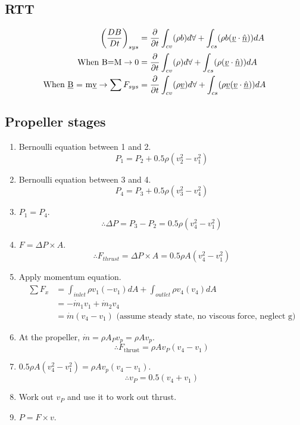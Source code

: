 \subsection{RTT}
\begin{align*}
  \left( \frac{DB}{Dt} \right)_{sys}                                    & = \frac{\partial}{\partial t}\int_{cv}(\rho b) d\forall + \int_{cs} (\rho b(\underline{v} \cdot \underline{\hat{n}})) dA                          \\
  \textrm{When B=M} \rightarrow 0                                       & = \frac{\partial}{\partial t}\int_{cv}(\rho) d\forall + \int_{cs} (\rho(\underline{v} \cdot \underline{\hat{n}})) dA                              \\
  \textrm{When \underline{B} = m\underline{v}} \rightarrow \sum F_{sys} & = \frac{\partial}{\partial t}\int_{cv}(\rho \underline{v}) d\forall + \int_{cs} (\rho \underline{v} (\underline{v} \cdot \underline{\hat{n}})) dA \\
\end{align*}
\subsection{Propeller stages}
\begin{enumerate}
  \item Bernoulli equation between 1 and 2. \[ P_1 = P_2 +0.5\rho (v_2^2 - v_1^2) \]
  \item Bernoulli equation between 3 and 4. \[ P_4 = P_3 +0.5\rho (v_3^2 - v_4^2) \]
  \item \( P_1 = P_4 \). \[ \therefore \Delta P = P_3 - P_2 = 0.5 \rho (v_4^2 - v_1^2) \]
  \item \( F=\Delta P \times A \). \[ \therefore F_{thrust} = \Delta P \times A = 0.5 \rho A (v_4^2 - v_1^2) \]
  \item Apply momentum equation.
        \begin{align*}
          \sum F_x & = \int_{inlet}\rho v_1 (-v_1)dA + \int_{outlet}\rho v_4 (v_4)dA                   \\
                   & = -\dot{m}_1 v_1 + \dot{m}_2 v_4                                                  \\
                   & = \dot{m}(v_4 - v_1) \textrm{ (assume steady state, no viscous force, neglect g)}
        \end{align*}
  \item At the propeller, \( \dot{m} = \rho A_P v_p = \rho A v_p \). \[ \therefore F_{\textrm{thrust}} = \rho A v_P(v_4 - v_1) \]
  \item \( 0.5 \rho A (v_4^2 - v_1^2) = \rho A v_p (v_4 - v_1) \). \[ \therefore v_P = 0.5 (v_4 + v_1) \]
  \item Work out \(v_P\) and use it to work out thrust.
  \item \( P = F \times v \).
\end{enumerate}
